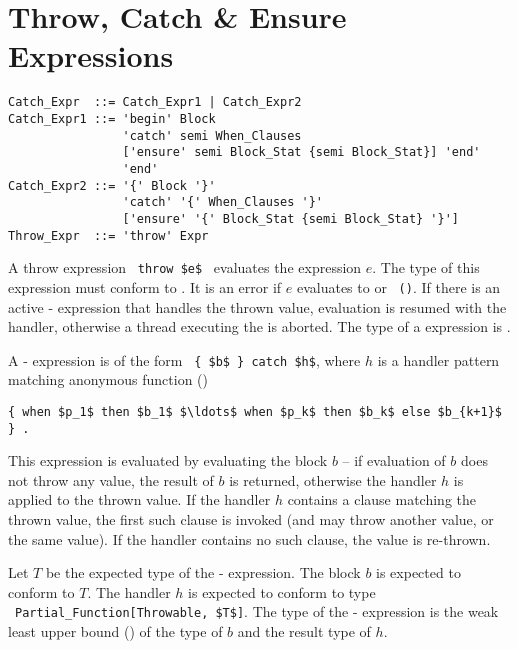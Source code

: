 




\section{Throw, Catch \& Ensure Expressions}
\label{sec:throw-catch-expressions}

\syntax\begin{lstlisting}
Catch_Expr  ::= Catch_Expr1 | Catch_Expr2
Catch_Expr1 ::= 'begin' Block 
                'catch' semi When_Clauses
                ['ensure' semi Block_Stat {semi Block_Stat}] 'end'
                'end'
Catch_Expr2 ::= '{' Block '}'
                'catch' '{' When_Clauses '}'
                ['ensure' '{' Block_Stat {semi Block_Stat} '}']
Throw_Expr  ::= 'throw' Expr
\end{lstlisting}

A throw expression ~\lstinline!throw $e$!~ evaluates the expression $e$. The type of this expression must conform to . It is an error if $e$ evaluates to  or ~\lstinline!()!. If there is an active - expression that handles the thrown value, evaluation is resumed with the handler, otherwise a thread executing the  is aborted. The type of a  expression is . 

A - expression is of the form ~\lstinline!{ $b$ } catch $h$!, where $h$ is a handler pattern matching anonymous function ()
\begin{lstlisting}
{ when $p_1$ then $b_1$ $\ldots$ when $p_k$ then $b_k$ else $b_{k+1}$ } .
\end{lstlisting}

This expression is evaluated by evaluating the block $b$ -- if evaluation of $b$ does not throw any value, the result of $b$ is returned, otherwise the handler $h$ is applied to the thrown value. If the handler $h$ contains a  clause matching the thrown value, the first such clause is invoked (and may throw another value, or the same value). If the handler contains no such clause, the value is re-thrown. 

Let $T$ be the expected type of the - expression. The block $b$ is expected to conform to $T$. The handler $h$ is expected to conform to type ~\lstinline!Partial_Function[Throwable, $T$]!. The type of the - expression is the weak least upper bound () of the type of $b$ and the result type of $h$. 


